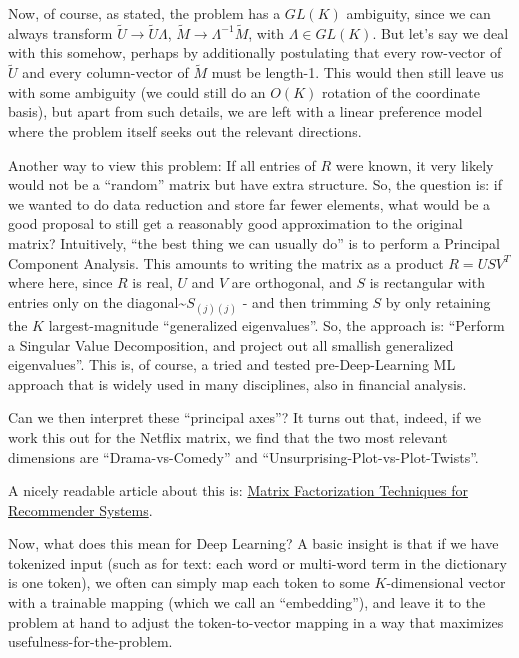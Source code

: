 \documentclass[11pt]{article}
\begin{document}
Now, of course, as stated, the problem has a \(GL(K)\) ambiguity, since
we can always transform \(\tilde U\to \tilde U \Lambda\),
\(\tilde M\to \Lambda^{-1} \tilde M\), with \(\Lambda\in GL(K)\). But
let's say we deal with this somehow, perhaps by additionally postulating
that every row-vector of \(\tilde U\) and every column-vector of
\(\tilde M\) must be length-1. This would then still leave us with some
ambiguity (we could still do an \(O(K)\) rotation of the coordinate
basis), but apart from such details, we are left with a linear
preference model where the problem itself seeks out the relevant
directions.

Another way to view this problem: If all entries of \(R\) were known, it
very likely would not be a ``random'' matrix but have extra structure.
So, the question is: if we wanted to do data reduction and store far
fewer elements, what would be a good proposal to still get a reasonably
good approximation to the original matrix? Intuitively, ``the best thing
we can usually do'' is to perform a Principal Component Analysis. This
amounts to writing the matrix as a product \(R=USV^T\) where here, since
\(R\) is real, \(U\) and \(V\) are orthogonal, and \(S\) is rectangular
with entries only on the diagonal\textasciitilde{}\(S_{(j)(j)}\) - and
then trimming \(S\) by only retaining the \(K\) largest-magnitude
``generalized eigenvalues''. So, the approach is: ``Perform a Singular
Value Decomposition, and project out all smallish generalized
eigenvalues''. This is, of course, a tried and tested pre-Deep-Learning
ML approach that is widely used in many disciplines, also in financial
analysis.

Can we then interpret these ``principal axes''? It turns out that,
indeed, if we work this out for the Netflix matrix, we find that the two
most relevant dimensions are ``Drama-vs-Comedy'' and
``Unsurprising-Plot-vs-Plot-Twists''.

A nicely readable article about this is:
\href{https://datajobs.com/data-science-repo/Recommender-Systems-\%5BNetflix\%5D.pdf}{Matrix
Factorization Techniques for Recommender Systems}.

Now, what does this mean for Deep Learning? A basic insight is that if
we have tokenized input (such as for text: each word or multi-word term
in the dictionary is one token), we often can simply map each token to
some \(K\)-dimensional vector with a trainable mapping (which we call an
``embedding''), and leave it to the problem at hand to adjust the
token-to-vector mapping in a way that maximizes
usefulness-for-the-problem.
\end{document}
